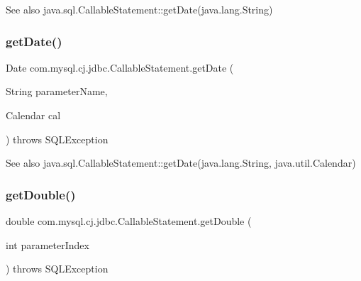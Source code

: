 \begin{DoxySeeAlso}{See also}
java.\+sql.\+Callable\+Statement\+::get\+Date(java.\+lang.\+String) 
\end{DoxySeeAlso}
\mbox{\label{classcom_1_1mysql_1_1cj_1_1jdbc_1_1_callable_statement_a5fa3659ab861ea6df99551e4811d7b22}} 
\subsubsection{\texorpdfstring{get\+Date()}{getDate()}\hspace{0.1cm}{\footnotesize\ttfamily [4/4]}}
{\footnotesize\ttfamily Date com.\+mysql.\+cj.\+jdbc.\+Callable\+Statement.\+get\+Date (\begin{DoxyParamCaption}\item[{String}]{parameter\+Name,  }\item[{Calendar}]{cal }\end{DoxyParamCaption}) throws S\+Q\+L\+Exception}

\begin{DoxySeeAlso}{See also}
java.\+sql.\+Callable\+Statement\+::get\+Date(java.\+lang.\+String, java.\+util.\+Calendar) 
\end{DoxySeeAlso}
\mbox{\label{classcom_1_1mysql_1_1cj_1_1jdbc_1_1_callable_statement_ab147f6da64dfa262ea1bed1a7c955c71}} 
\subsubsection{\texorpdfstring{get\+Double()}{getDouble()}\hspace{0.1cm}{\footnotesize\ttfamily [1/2]}}
{\footnotesize\ttfamily double com.\+mysql.\+cj.\+jdbc.\+Callable\+Statement.\+get\+Double (\begin{DoxyParamCaption}\item[{int}]{parameter\+Index }\end{DoxyParamCaption}) throws S\+Q\+L\+Exception}

